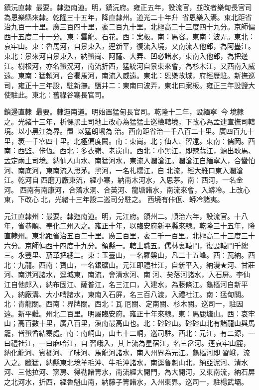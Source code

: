 \begin{pinyinscope}
鎮沅直隸：最要。隸迤南道。明，鎮沅府。雍正五年，設流官，並改者樂甸長官司為恩樂縣來隸。乾隆三十五年，降直隸州。道光二十年升，省恩樂入焉。東北距省治九百一十里。廣三百四十里，袤二百九十里。北極高二十三度四十九分。京師偏西十五度二十一分。東：雲龍、石花。西：案板。南：馬容。東南：波弄。東北：哀牢山。東：魯馬河，自景東入，逕新平，復流入境，又南流人他郎，為阿墨江。東北：景來河自景東入，納蠻崗、阿薩、大弄、凹必諸水，東南入他郎，為把邊江。樹根河，亦名蠻況河，南流折西，猛統河自景東來會，為杉木江，又西南入威遠。東南：猛賴河，合欄馬河，南流入威遠。東北：恩樂故城，府經歷駐。新撫巡司，雍正十三年設，駐新撫。鹽井二：東南曰波弄，東北曰案板。雍正三年設鹽大使駐此。東北：舊祿谷寨長官司。

鎮邊直隸：最要。隸迤南道。明始置猛甸長官司。乾隆十二年，設緬寧，今境隸之。光緒十三年，析惈黑土司地上改心為猛猛土巡檢轄境，下改心為孟連宣撫司轄境。以小黑江為界。置，以猛朗壩為治。西南距省治一千八百二十里。廣四百九十里，袤一千零四十里。北極偏度闕。南：東崗。北；仙人、習遠。東南：儒岡。西南：西監、佧佤。西北：多衣嶺、老炭山。西北：小黑江，即辣蒜江，源出耿馬、孟定兩土司境。納仙人山水、南猛河水，東流入瀾滄江。瀾滄江自緬寧入，合蠻怕河、南底河，東南流入思茅。黑河，一名札糯江，自北流，經大雅口東入瀾滄江。乾河自西磨刀廠東流，經小寨，納南木河水，入思茅。南：西河，一名金河。西南有南康河，合落水洞、合英河、龍塘諸水，南流來會，入蟒冷。上改心東，下改心北，光緒十三年設二巡司分駐之。西境有佧佤、蟒冷諸夷。

元江直隸州：最要。隸迤南道。明，元江府。領州二。順治六年，設流官。十八年，省恭順、奉化二州入之。雍正十年，以臨安府新平縣來隸。乾隆三十五年，降直隸州。東北距省治五百二十里。廣三百里，袤二千一百里。北極高二十三度三十六分。京師偏西十四度十九分。領縣一。轄土職五。儒林裏轅門，復設轅門千總三。永豐里、茄革把總二。東：玉臺山，一名羅槃山，凡二十五峰。西：瓦納。西北：九龍。西南：寶山，一名銀礦山。元江即禮社江，自新平入，納漫★河、甘莊河、南淇河諸水，逕城東，南流，會清水河、南河、矣落河諸水，入石屏。李仙江自他郎入，納布固江、薩普江，名三江口，入建水，為藤條江。龜樞河自新平入，納廠溝、大小哨諸水，東南入石屏，名三百八渡，入禮社江。南：猛甸關。北：青龍關。西南：界牌關。西北：瓦厄關、定南關、杉木關。巡司一，駐因遠。新平難。州北二百里。明屬臨安府。雍正十年來隸。東：馬鹿塘山。西：哀牢山；高百數十里，廣八百里，滇南最高山也。北：硿硿山。硿硿山北有諸龍山與馬籠，皆蠻酋結寨處。南：南峒山，山七十二峒，巡司駐。西北：元江，有二源，一曰禮社江，一曰麻哈江，自習峨入，其上流為星宿江，名三岔河。逕哀牢山麓，納化龍河、賓橘河、了味河、馬龍河諸水，南入州界為元江。龜樞河即習峨，流入之。臘猛，納縣東北境羊毛沖、牛毛沖諸水，南逕魯魁山北，納亞泥河、清水河、三他拉河、窯房、得勒諸箐水，南流經大開門，為大開河，又東南流，納石屏之北河水，折西，經魯魁山南，納藤子箐諸水，入州東界。巡司一，駐楊武壩。


\end{pinyinscope}
